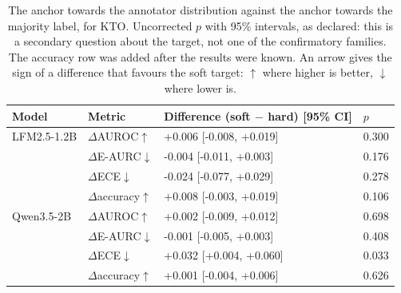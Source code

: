 \begin{table}[t]
\centering
\caption{The anchor towards the annotator distribution against the anchor towards the majority label, for KTO. Uncorrected $p$ with 95\% intervals, as declared: this is a secondary question about the target, not one of the confirmatory families. The accuracy row was added after the results were known. An arrow gives the sign of a difference that favours the soft target: $\uparrow$ where higher is better, $\downarrow$ where lower is.}
\label{tab:soft-vs-hard}
\small
\begin{tabular}{llll}
\toprule
Model & Metric & Difference (soft $-$ hard) [95\% CI] & $p$ \\
\midrule
LFM2.5-1.2B & $\Delta$AUROC$\uparrow$ & +0.006 [-0.008, +0.019] & 0.300 \\
 & $\Delta$E-AURC$\downarrow$ & -0.004 [-0.011, +0.003] & 0.176 \\
 & $\Delta$ECE$\downarrow$ & -0.024 [-0.077, +0.029] & 0.278 \\
 & $\Delta$accuracy$\uparrow$ & +0.008 [-0.003, +0.019] & 0.106 \\
\addlinespace
Qwen3.5-2B & $\Delta$AUROC$\uparrow$ & +0.002 [-0.009, +0.012] & 0.698 \\
 & $\Delta$E-AURC$\downarrow$ & -0.001 [-0.005, +0.003] & 0.408 \\
 & $\Delta$ECE$\downarrow$ & +0.032 [+0.004, +0.060] & 0.033 \\
 & $\Delta$accuracy$\uparrow$ & +0.001 [-0.004, +0.006] & 0.626 \\
\bottomrule
\end{tabular}
\end{table}
